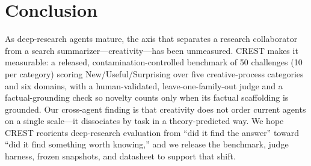 \section{Conclusion}
As deep-research agents mature, the axis that separates a research collaborator from a search summarizer---creativity---has been unmeasured. \textsc{CREST} makes it measurable: a released, contamination-controlled benchmark of 50 challenges (10 per category) scoring New/Useful/Surprising over five creative-process categories and six domains, with a human-validated, leave-one-family-out judge and a factual-grounding check so novelty counts only when its factual scaffolding is grounded. Our cross-agent finding is that creativity does not order current agents on a single scale---it dissociates by task in a theory-predicted way. We hope CREST reorients deep-research evaluation from ``did it find the answer'' toward ``did it find something worth knowing,'' and we release the benchmark, judge harness, frozen snapshots, and datasheet to support that shift.
